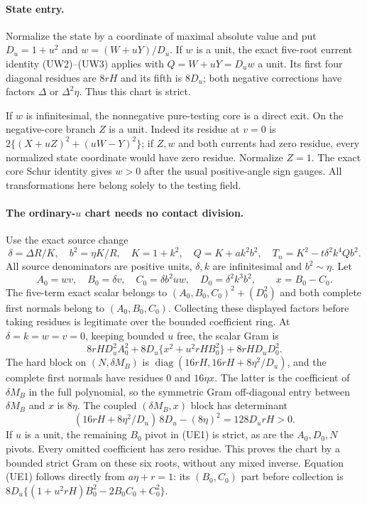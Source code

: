 \paragraph{State entry.}
Normalize the state by a coordinate of maximal absolute value and put
$D_u=1+u^2$ and $w=(W+uY)/D_u$. If $w$ is a unit, the exact five-root
current identity (UW2)--(UW3) applies with $Q=W+uY=D_uw$ a unit.
Its first four diagonal residues are $8rH$ and its fifth is
$8D_u$; both negative corrections have factors $\Delta$ or
$\Delta^2\eta$. Thus this chart is strict.

If $w$ is infinitesimal, the nonnegative pure-testing core is a direct
exit. On the negative-core branch $Z$ is a unit. Indeed its residue
at $v=0$ is $2\{(X+uZ)^2+(uW-Y)^2\}$; if $Z,w$ and both currents
had zero residue, every normalized state coordinate would have zero
residue. Normalize $Z=1$. The exact core Schur identity gives $w>0$
after the usual positive-angle sign gauges. All transformations here
belong solely to the testing field.

\paragraph{The ordinary-$u$ chart needs no contact division.}
Use the exact source change
\[
 \delta=\Delta R/K,\quad b^2=\eta K/R,\quad K=1+k^2,
 \quad Q=K+ak^2b^2,\quad T_n=K^2-t\delta^2k^4Qb^2.
\]
All source denominators are positive units, $\delta,k$ are
infinitesimal and $b^2\sim\eta$. Let
\[
 A_0=wv,\quad B_0=\delta v,\quad C_0=\delta b^2uw,
 \quad D_0=\delta^2k^3b^2,\qquad x=B_0-C_0.
\]
The five-term exact scalar belongs to
$(A_0,B_0,C_0)^2+(D_0^2)$ and both complete first normals belong
to $(A_0,B_0,C_0)$. Collecting these displayed factors before taking
residues is legitimate over the bounded coefficient ring. At
$\delta=k=w=v=0$, keeping bounded $u$ free, the scalar Gram is
\[
 8rH D_u^2A_0^2+
 8D_u\{x^2+u^2rH B_0^2\}+8rH D_uD_0^2.
 \tag{UE1}
\]
The hard block on $(N,\delta M_B)$ is
$\operatorname{diag}(16rH,16rH+8\eta^2/D_u)$, and the complete
first normals have residues $0$ and $16\eta x$. The latter is the
coefficient of $\delta M_B$ in the full polynomial, so the symmetric
Gram off-diagonal entry between $\delta M_B$ and $x$ is $8\eta$.
The coupled $(\delta M_B,x)$ block has determinant
\[
 (16rH+8\eta^2/D_u)\,8D_u-(8\eta)^2=128D_urH>0.
 \tag{UE2}
\]
If $u$ is a unit, the remaining $B_0$ pivot in (UE1) is strict,
as are the $A_0,D_0,N$ pivots. Every omitted coefficient has zero
residue. This proves the chart by a bounded strict Gram on these
six roots, without any mixed inverse. Equation (UE1) follows directly
from $a\eta+r=1$: its $(B_0,C_0)$ part before collection is
$8D_u\{(1+u^2rH)B_0^2-2B_0C_0+C_0^2\}$.

